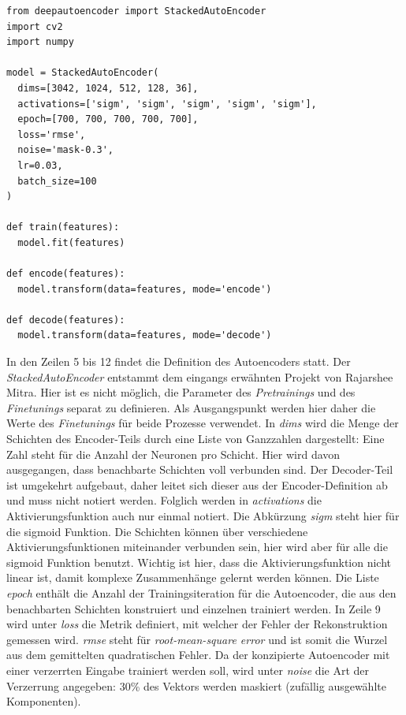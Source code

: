 \begin{lstlisting}[style=Python]
from deepautoencoder import StackedAutoEncoder
import cv2
import numpy

model = StackedAutoEncoder(
  dims=[3042, 1024, 512, 128, 36],
  activations=['sigm', 'sigm', 'sigm', 'sigm', 'sigm'], 
  epoch=[700, 700, 700, 700, 700], 
  loss='rmse', 
  noise='mask-0.3',
  lr=0.03, 
  batch_size=100
)

def train(features):
  model.fit(features)

def encode(features):
  model.transform(data=features, mode='encode')
  
def decode(features):
  model.transform(data=features, mode='decode')
\end{lstlisting}

In den Zeilen 5 bis 12 findet die Definition des Autoencoders statt. Der \textit{StackedAutoEncoder} entstammt dem eingangs erwähnten Projekt von Rajarshee Mitra. Hier ist es nicht möglich, die Parameter des \textit{Pretrainings} und des \textit{Finetunings} separat zu definieren. Als Ausgangspunkt werden hier daher die Werte des \textit{Finetunings} für beide Prozesse verwendet. In \textit{dims} wird die Menge der Schichten des Encoder-Teils durch eine Liste von Ganzzahlen dargestellt: Eine Zahl steht für die Anzahl der Neuronen pro Schicht. Hier wird davon ausgegangen, dass benachbarte Schichten voll verbunden sind. Der Decoder-Teil ist umgekehrt aufgebaut, daher leitet sich dieser aus der Encoder-Definition ab und muss nicht notiert werden. Folglich werden in \textit{activations} die Aktivierungsfunktion auch nur einmal notiert. Die Abkürzung \textit{sigm} steht hier für die sigmoid Funktion. Die Schichten können über verschiedene Aktivierungsfunktionen miteinander verbunden sein, hier wird aber für alle die sigmoid Funktion benutzt. Wichtig ist hier, dass die Aktivierungsfunktion nicht linear ist, damit komplexe Zusammenhänge gelernt werden können. Die Liste \textit{epoch} enthält die Anzahl der Trainingsiteration für die Autoencoder, die aus den benachbarten Schichten konstruiert und einzelnen trainiert werden. In Zeile 9 wird unter \textit{loss} die Metrik definiert, mit welcher der Fehler der Rekonstruktion gemessen wird. \textit{rmse} steht für \textit{root-mean-square error} und ist somit die Wurzel aus dem gemittelten quadratischen Fehler. Da der konzipierte Autoencoder mit einer verzerrten Eingabe trainiert werden soll, wird unter \textit{noise} die Art der Verzerrung angegeben: 30\% des Vektors werden maskiert (zufällig ausgewählte Komponenten).
